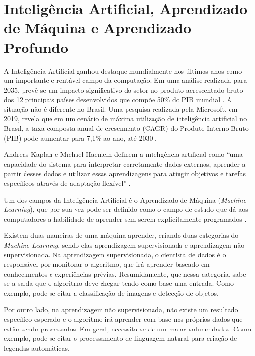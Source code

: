 \section{Inteligência Artificial, Aprendizado de Máquina e Aprendizado Profundo}

\indent
\par A Inteligência Artificial ganhou destaque mundialmente nos últimos anos como um importante e rentável campo da computação. Em uma análise realizada para 2035, prevê-se um impacto significativo do setor no produto acrescentado bruto dos 12 principais países desenvolvidos que compõe 50\% do PIB mundial \cite{Accenture2016}. A situação não é diferente no Brasil. Uma pesquisa realizada pela Microsoft, em 2019, revela que em um cenário de máxima utilização de inteligência artificial no Brasil, a taxa composta anual de crescimento (CAGR) do Produto Interno Bruto (PIB) pode aumentar para 7,1\% ao ano, até 2030 \cite{MicrosoftNewsCenterBrasil2019}.

\par Andreas Kaplan e Michael Haenlein definem a inteligência artificial como “uma capacidade do sistema para interpretar corretamente dados externos, aprender a partir desses dados e utilizar essas aprendizagens para atingir objetivos e tarefas específicos através de adaptação flexível” \cite{Kaplan2019}.

\par Um dos campos da Inteligência Artificial é o Aprendizado de Máquina (\textit{Machine Learning}), que por sua vez pode ser definido como o campo de estudo que dá aos computadores a habilidade de aprender sem serem explicitamente programados \cite{Samuel1967}.

\par Existem duas maneiras de uma máquina aprender, criando duas categorias do \textit{Machine Learning}, sendo elas aprendizagem supervisionada e aprendizagem não supervisionada. Na aprendizagem supervisionada, o cientista de dados é o responsável por monitorar o algoritmo, que irá aprender baseado em conhecimentos e experiências prévias. Resumidamente, que nessa categoria, sabe-se a saída que o algoritmo deve chegar tendo como base uma entrada. Como exemplo, pode-se citar a classificação de imagens e detecção de objetos.

\par Por outro lado, na aprendizagem não supervisionada, não existe um resultado específico esperado e o algoritmo irá aprender com base nos próprios dados que estão sendo processados. Em geral, necessita-se de um maior volume dados. Como exemplo, pode-se citar o processamento de linguagem natural para criação de legendas automáticas.

